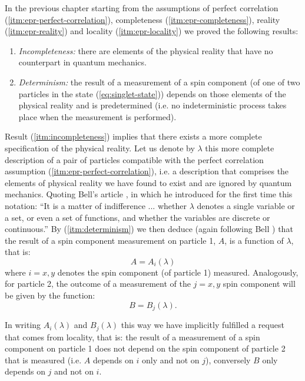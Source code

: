 In the previous chapter starting from the assumptions of perfect correlation (\ref{itm:epr-perfect-correlation}), completeness (\ref{itm:epr-completeness}), reality (\ref{itm:epr-reality}) and locality (\ref{itm:epr-locality}) we proved the following results:
\begin{enumerate}
  \renewcommand{\theenumi}{\roman{enumi}}
  \renewcommand{\labelenumi}{(\theenumi)}
\item \label{itm:incompleteness} \textit{Incompleteness:} there are elements of the physical reality that have no counterpart in quantum mechanics.
\item \label{itm:determinism} \textit{Determinism:} the result of a measurement of a spin component (of one of two particles in the state (\ref{eq:singlet-state})) depends on those elements of the physical reality and is predetermined (i.e. no indeterministic process takes place when the measurement is performed).%
\end{enumerate}
Result (\ref{itm:incompleteness}) implies that there exists a more complete specification of the physical reality. Let us denote by $\lambda$ this more complete description of a pair of particles compatible with the perfect correlation assumption (\ref{itm:epr-perfect-correlation}), i.e. a description that comprises the elements of physical reality we have found to exist and are ignored by quantum mechanics. Quoting Bell's article \cite{Bell1964}, in which he introduced for the first time this notation: ``It is a matter of indifference ... whether $\lambda$ denotes a single variable or a set, or even a set of functions, and whether the variables are discrete or continuous.'' By (\ref{itm:determinism}) we then deduce (again following Bell \cite{Bell1964}) that the result of a spin component measurement on particle 1, $A$, is a function of $\lambda$, that is:
\begin{equation}
  A = A_i(\lambda)
  \label{eq:results-particle-1}
\end{equation}
where $i = x, y$ denotes the spin component (of particle 1) measured. Analogously, for particle 2, the outcome of a measurement of the $j = x, y$ spin component will be given by the function:
\begin{equation}
 B  = B_j(\lambda).
 \label{eq:results-particle-2}
\end{equation}

In writing $A_i(\lambda)$ and $B_j(\lambda)$ this way we have implicitly fulfilled a request that comes from locality, that is: the result of a measurement of a spin component on particle 1 does not depend on the spin component of particle 2 that is measured (i.e. $A$ depends on $i$ only and not on $j$), conversely $B$ only depends on $j$ and not on $i$.%

